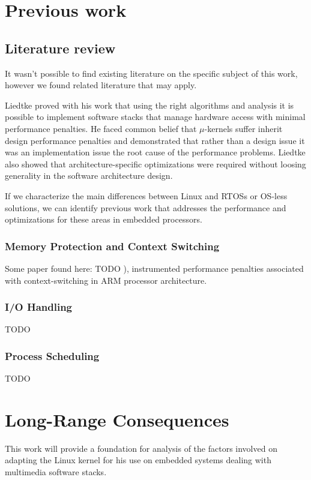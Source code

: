 \section{Previous work}
\subsection{Literature review}
It wasn't possible to find existing literature on the specific subject of this work, however we found related literature that may apply.

Liedtke \citep{Liedtke:1995kx} proved with his work that using the right algorithms and analysis it is possible to implement software stacks that manage hardware access with minimal performance penalties. He faced common belief that $\mu$-kernels suffer inherit design performance penalties and demonstrated that rather than a design issue it was an implementation issue the root cause of the performance problems. Liedtke also showed that architecture-specific optimizations were required without loosing generality in the software architecture design.

If we characterize the main differences between Linux and \acp{RTOS} or \ac{OS}-less solutions, we can identify previous work that addresses the performance and optimizations for these areas in embedded processors.

\subsubsection{Memory Protection and Context Switching}

Some paper found here: TODO \citep{Chanteperdrix:2009fk}), instrumented performance penalties associated with context-switching in ARM processor architecture.

\subsubsection{I/O Handling}
TODO

\subsubsection{Process Scheduling}
TODO

\section{Long-Range Consequences}
This work will provide a foundation for analysis of the factors involved on adapting the Linux kernel for his use on embedded systems dealing with multimedia software stacks.
